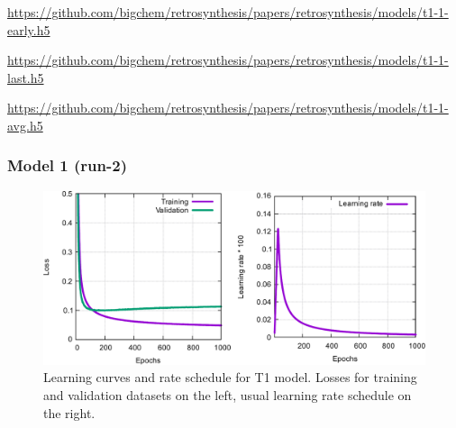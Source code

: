 \documentclass{article}
\begin{document}
\url{https://github.com/bigchem/retrosynthesis/papers/retrosynthesis/models/t1-1-early.h5}

\url{https://github.com/bigchem/retrosynthesis/papers/retrosynthesis/models/t1-1-last.h5}

\url{https://github.com/bigchem/retrosynthesis/papers/retrosynthesis/models/t1-1-avg.h5}


\newpage

\subsubsection{Model 1 (run-2)}
  
\begin{figure}[h!]
  \centering
  \includegraphics[width = 16.5cm]{images/t12.pdf}
  \caption{Learning curves and rate schedule for T1 model. Losses for training and validation datasets on the left, usual learning rate schedule on the right.}
  \label{fig:t11}
\end{figure}
\end{document}
